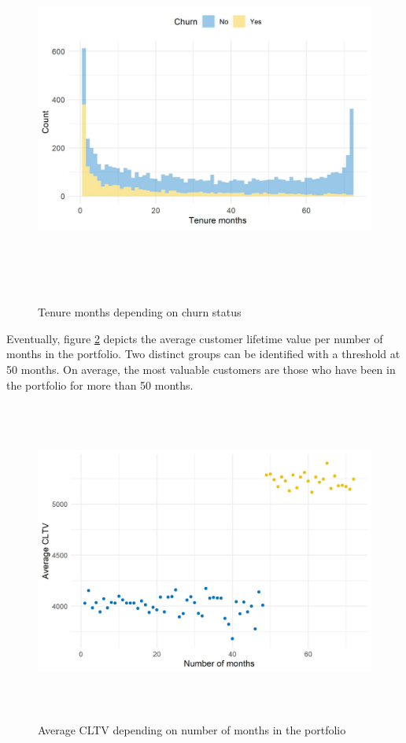 \documentclass[
]{book}
\begin{document}
\begin{figure}

{\centering \includegraphics[width=500pt,height=350pt]{./imgs/duration_churn_plot} 

}

\caption{Tenure months depending on churn status}\label{fig:churndur}
\end{figure}

Eventually, figure \ref{fig:cltvdur} depicts the average customer lifetime value per number of months in the portfolio. Two distinct groups can be identified with a threshold at 50 months. On average, the most valuable customers are those who have been in the portfolio for more than 50 months.

\begin{figure}

{\centering \includegraphics[width=450pt,height=300pt]{./imgs/avg_cltv_plot} 

}

\caption{Average CLTV depending on number of months in the portfolio}\label{fig:cltvdur}
\end{figure}
\end{document}
